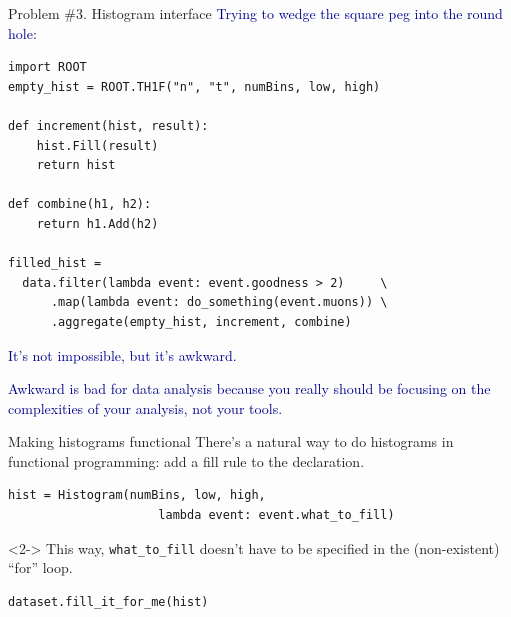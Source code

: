 \documentclass{beamer}
\begin{document}
\begin{frame}[fragile]{Problem \#3. Histogram interface}
\vspace{0.4 cm}
\textcolor{darkblue}{Trying to wedge the square peg into the round hole:}

\small
\begin{verbatim}
import ROOT
empty_hist = ROOT.TH1F("n", "t", numBins, low, high)

def increment(hist, result):
    hist.Fill(result)
    return hist

def combine(h1, h2):
    return h1.Add(h2)

filled_hist =
  data.filter(lambda event: event.goodness > 2)     \
      .map(lambda event: do_something(event.muons)) \
      .aggregate(empty_hist, increment, combine)
\end{verbatim}
\end{frame}

\begin{frame}{}
\begin{center}
\vfill
\large \textcolor{darkblue}{It's not impossible, but it's awkward.}

\vfill
\textcolor{darkblue}{Awkward is bad for data analysis because you really should be focusing on the complexities of your analysis, not your tools.}

\vfill
\end{center}
\end{frame}

\begin{frame}[fragile]{Making histograms functional}
There's a natural way to do histograms in functional programming: add a fill rule to the declaration.

\small
\begin{verbatim}
hist = Histogram(numBins, low, high,
                     lambda event: event.what_to_fill)
\end{verbatim}
\normalsize

\vfill
\begin{uncoverenv}<2->
This way, {\tt\small what\_to\_fill} doesn't have to be specified in the (non-existent) ``for'' loop.

\small
\begin{verbatim}
dataset.fill_it_for_me(hist)
\end{verbatim}
\end{uncoverenv}
\end{frame}
\end{document}
